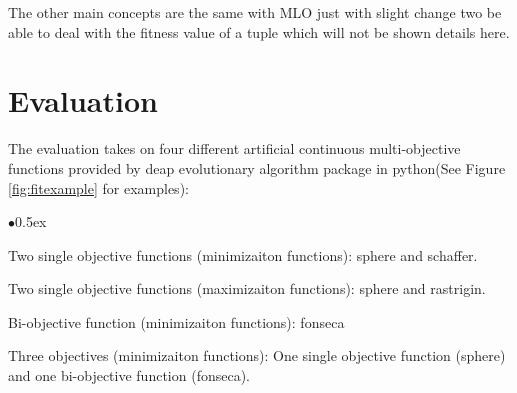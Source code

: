 \documentclass[12pt, runningheads,a4paper]{llncs}
\begin{document}
The other main concepts are the same with MLO just with slight change two be able to deal with the fitness value of a tuple which will not be shown details here.

\section{Evaluation}
\label{evaluation}

The evaluation takes on four different  artificial continuous multi-objective functions provided by deap evolutionary algorithm package in python(See Figure \ref{fig:fitexample} for examples):
\begin{list}{$\bullet$}{\itemsep 0.5ex}
\item Two single objective functions (minimizaiton functions): sphere and schaffer.
\item Two single objective functions (maximizaiton functions): sphere and rastrigin.
\item Bi-objective function (minimizaiton functions):  fonseca
\item Three objectives (minimizaiton functions): One single objective function (sphere) and one bi-objective function (fonseca).
\end{list}
\end{document}
